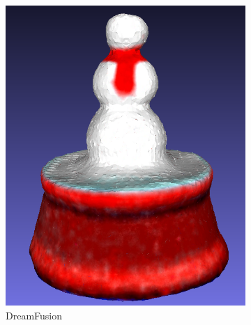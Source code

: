 \begin{figure}[ht]
    \centering
    \small
    \begin{subfigure}[b]{0.232\textwidth}
        \centering
        \includegraphics[width=\textwidth]{figures/subjective/dreamfusion_globe_result.png}
        \caption{DreamFusion}
        \vspace{0.1cm}
    \end{subfigure}
    \begin{subfigure}[b]{0.17\textwidth}
        \centering

\end{subfigure}
\end{figure}
